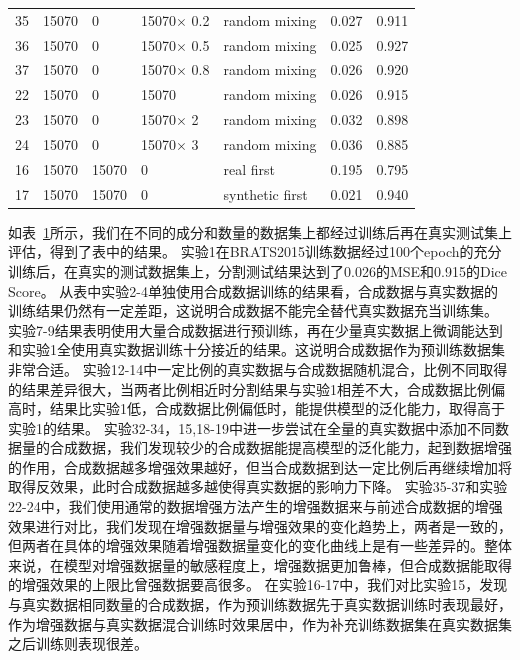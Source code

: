 \documentclass[letterpaper]{article} %
\begin{document}
\begin{table}[t]
{\begin{tabular}{lllllll}
			35& 15070 &0 & 15070$\times$ 0.2   &random mixing &0.027 &0.911 \\
			36& 15070 &0 & 15070$\times$ 0.5   &random mixing &0.025 &0.927 \\
			37& 15070 &0 & 15070$\times$ 0.8   &random mixing &0.026 &0.920 \\
			22& 15070 &0 & 15070           &random mixing &0.026 &0.915 \\
			23& 15070 &0 & 15070$\times$ 2 &random mixing &0.032 &0.898 \\
			24& 15070 &0 & 15070$\times$ 3 &random mixing &0.036 &0.885 \\
			
			16& 15070 & 15070 &0  &real first &0.195 &0.795 \\
			17& 15070 & 15070 &0  &synthetic
			first &0.021 &0.940 \\
			\bottomrule
		\end{tabular}
	}
	\label{use_test}
\end{table}
如表~\ref{use_test}所示，我们在不同的成分和数量的数据集上都经过训练后再在真实测试集上评估，得到了表中的结果。
实验1在BRATS2015训练数据经过100个epoch的充分训练后，在真实的测试数据集上，分割测试结果达到了0.026的MSE和0.915的Dice Score。
从表中实验2-4单独使用合成数据训练的结果看，合成数据与真实数据的训练结果仍然有一定差距，这说明合成数据不能完全替代真实数据充当训练集。
实验7-9结果表明使用大量合成数据进行预训练，再在少量真实数据上微调能达到和实验1全使用真实数据训练十分接近的结果。这说明合成数据作为预训练数据集非常合适。
实验12-14中一定比例的真实数据与合成数据随机混合，比例不同取得的结果差异很大，当两者比例相近时分割结果与实验1相差不大，合成数据比例偏高时，结果比实验1低，合成数据比例偏低时，能提供模型的泛化能力，取得高于实验1的结果。
实验32-34，15,18-19中进一步尝试在全量的真实数据中添加不同数据量的合成数据，我们发现较少的合成数据能提高模型的泛化能力，起到数据增强的作用，合成数据越多增强效果越好，但当合成数据到达一定比例后再继续增加将取得反效果，此时合成数据越多越使得真实数据的影响力下降。
实验35-37和实验22-24中，我们使用通常的数据增强方法产生的增强数据来与前述合成数据的增强效果进行对比，我们发现在增强数据量与增强效果的变化趋势上，两者是一致的，但两者在具体的增强效果随着增强数据量变化的变化曲线上是有一些差异的。整体来说，在模型对增强数据量的敏感程度上，增强数据更加鲁棒，但合成数据能取得的增强效果的上限比曾强数据要高很多。
在实验16-17中，我们对比实验15，发现与真实数据相同数量的合成数据，作为预训练数据先于真实数据训练时表现最好，作为增强数据与真实数据混合训练时效果居中，作为补充训练数据集在真实数据集之后训练则表现很差。
\end{document}
